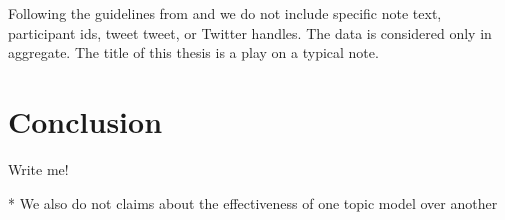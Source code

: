 \documentclass [11pt, proquest] {uwthesis}[2020/02/24]
\newenvironment{demo}
  {\begin{alltt}\leftskip3em
     \def\\{\ttfamily\char`\\}%
     \def\{{\ttfamily\char`\{}%
     \def\}{\ttfamily\char`\}}}
  {\end{alltt}}
\begin{document}
Following the guidelines from \cite{williams2017towards} and \cite{fiesler2018participant} we do not include specific note text, participant ids, tweet tweet, or Twitter handles. The data is considered only in aggregate. The title of this thesis is a play on a typical note.


\chapter{Conclusion}

Write me!

*  We also do not claims about the effectiveness of one topic model over another





\end{document}
